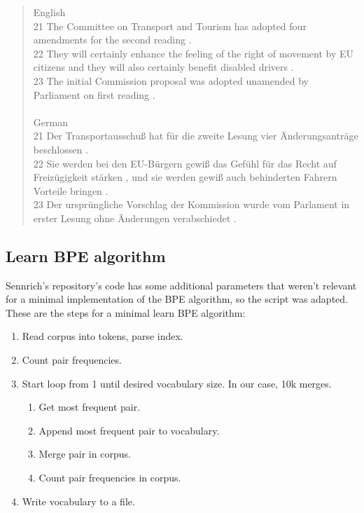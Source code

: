 \begin{quote}
	English\\
	21	The Committee on Transport and Tourism has adopted four amendments for the second reading .\\
	22	They will certainly enhance the feeling of the right of movement by EU citizens and they will also certainly benefit disabled drivers .\\
	23	The initial Commission proposal was adopted unamended by Parliament on first reading .\\\\
	German\\
	21	Der Transportausschuß hat für die zweite Lesung vier Änderungsanträge beschlossen .\\
	22	Sie werden bei den EU-Bürgern gewiß das Gefühl für das Recht auf Freizügigkeit stärken , und sie werden gewiß auch behinderten Fahrern Vorteile bringen .\\
	23	Der ursprüngliche Vorschlag der Kommission wurde vom Parlament in erster Lesung ohne Änderungen verabschiedet .
\end{quote}

\subsection{Learn BPE algorithm}

Sennrich's repository's code has some additional parameters that weren't relevant for a minimal implementation of the BPE algorithm, so the script was adapted. These are the steps for a minimal learn BPE algorithm:

\begin{enumerate}
	\item Read corpus into tokens, parse index.
	\item Count pair frequencies.
	\item Start loop from 1 until desired vocabulary size. In our case, 10k merges.
	\begin{enumerate}
		\item Get most frequent pair.
		\item Append most frequent pair to vocabulary.
		\item Merge pair in corpus.
		\item Count pair frequencies in corpus.
	\end{enumerate}
	\item Write vocabulary to a file.
\end{enumerate}

